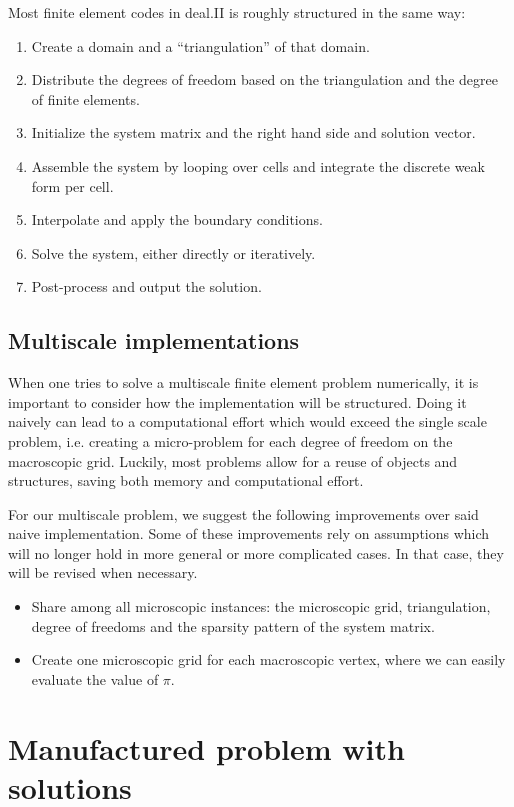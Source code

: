 \documentclass{article}
\begin{document}
Most finite element codes in deal.II is roughly structured in the same way:

\begin{enumerate}
    \item Create a domain and a ``triangulation'' of that domain.
    \item Distribute the degrees of freedom based on the triangulation and the degree of finite elements.
    \item Initialize the system matrix and the right hand side and solution vector.
    \item Assemble the system by looping over cells and integrate the discrete weak form per cell.
    \item Interpolate and apply the boundary conditions.
    \item Solve the system, either directly or iteratively.
    \item Post-process and output the solution.
\end{enumerate}



\subsection{Multiscale implementations}
When one tries to solve a multiscale finite element problem numerically, it is important to consider how the implementation will be structured.
Doing it naively can lead to a computational effort which would exceed the single scale problem, i.e. creating a micro-problem for each degree of freedom on the macroscopic grid.
Luckily, most problems allow for a reuse of objects and structures, saving both memory and computational effort.

For our multiscale problem, we suggest the following improvements over said naive implementation. Some of these improvements rely on assumptions which will no longer hold in more general or more complicated cases. In that case, they will be revised when necessary.
\begin{itemize}
    \item Share among all microscopic instances: the microscopic grid, triangulation, degree of freedoms and the sparsity pattern of the system matrix.
    \item Create one microscopic grid for each macroscopic vertex, where we can easily evaluate the value of $\pi$.
\end{itemize}

\section{Manufactured problem with solutions}
\end{document}
